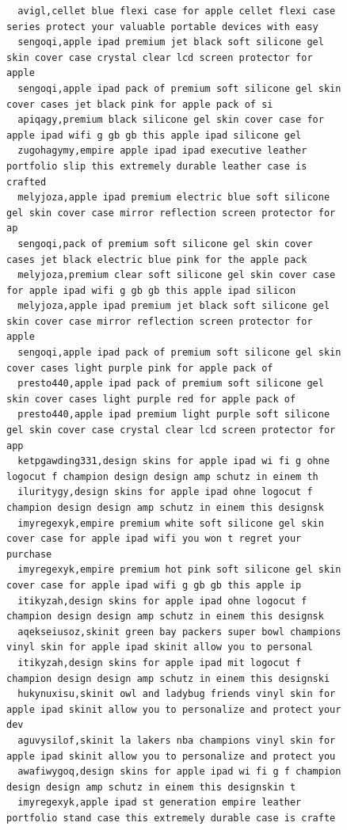 \begin{figure}[htpb]
\begin{verbatim}
  avigl,cellet blue flexi case for apple cellet flexi case series protect your valuable portable devices with easy
  sengoqi,apple ipad premium jet black soft silicone gel skin cover case crystal clear lcd screen protector for apple
  sengoqi,apple ipad pack of premium soft silicone gel skin cover cases jet black pink for apple pack of si
  apiqagy,premium black silicone gel skin cover case for apple ipad wifi g gb gb this apple ipad silicone gel
  zugohagymy,empire apple ipad ipad executive leather portfolio slip this extremely durable leather case is crafted
  melyjoza,apple ipad premium electric blue soft silicone gel skin cover case mirror reflection screen protector for ap
  sengoqi,pack of premium soft silicone gel skin cover cases jet black electric blue pink for the apple pack
  melyjoza,premium clear soft silicone gel skin cover case for apple ipad wifi g gb gb this apple ipad silicon
  melyjoza,apple ipad premium jet black soft silicone gel skin cover case mirror reflection screen protector for apple
  sengoqi,apple ipad pack of premium soft silicone gel skin cover cases light purple pink for apple pack of
  presto440,apple ipad pack of premium soft silicone gel skin cover cases light purple red for apple pack of
  presto440,apple ipad premium light purple soft silicone gel skin cover case crystal clear lcd screen protector for app
  ketpgawding331,design skins for apple ipad wi fi g ohne logocut f champion design design amp schutz in einem th
  iluritygy,design skins for apple ipad ohne logocut f champion design design amp schutz in einem this designsk
  imyregexyk,empire premium white soft silicone gel skin cover case for apple ipad wifi you won t regret your purchase
  imyregexyk,empire premium hot pink soft silicone gel skin cover case for apple ipad wifi g gb gb this apple ip
  itikyzah,design skins for apple ipad ohne logocut f champion design design amp schutz in einem this designsk
  aqekseiusoz,skinit green bay packers super bowl champions vinyl skin for apple ipad skinit allow you to personal
  itikyzah,design skins for apple ipad mit logocut f champion design design amp schutz in einem this designski
  hukynuxisu,skinit owl and ladybug friends vinyl skin for apple ipad skinit allow you to personalize and protect your dev
  aguvysilof,skinit la lakers nba champions vinyl skin for apple ipad skinit allow you to personalize and protect you
  awafiwygoq,design skins for apple ipad wi fi g f champion design design amp schutz in einem this designskin t
  imyregexyk,apple ipad st generation empire leather portfolio stand case this extremely durable case is crafte

\end{verbatim}
\end{figure}

